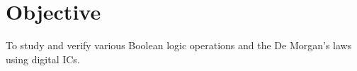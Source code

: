 \section{Objective}
To study and verify various Boolean logic operations and the De Morgan's laws using digital ICs.